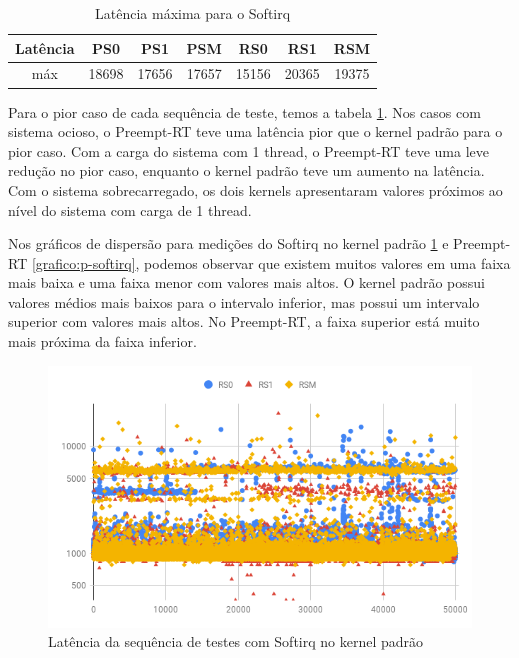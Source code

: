 \begin{table}[!htb]
    \centering
    \begin{center}
        \begin{tabular}{|c|c|c|c|c|c|c|}
            \toprule
                Latência & PS0 &    PS1 &    PSM &    RS0 &     RS1 &    RSM \\
            \midrule
                máx & 18698 &  17656 &  17657 & 15156 &  20365 &  19375 \\
            \bottomrule
        \end{tabular}
    \end{center}
    \caption{Latência máxima para o Softirq}
    \label{table:max-softirq}
\end{table}

Para o pior caso de cada sequência de teste, temos a tabela \ref{table:max-softirq}. Nos casos com sistema ocioso, o Preempt-RT teve uma latência pior que o kernel padrão para o pior caso. Com a carga do sistema com 1 thread, o Preempt-RT teve uma leve redução no pior caso, enquanto o kernel padrão teve um aumento na latência. Com o sistema sobrecarregado, os dois kernels apresentaram valores próximos ao nível do sistema com carga de 1 thread.

Nos gráficos de dispersão para medições do Softirq no kernel padrão \ref{grafico:r-softirq} e Preempt-RT \ref{grafico:p-softirq}, podemos observar que existem muitos valores em uma faixa mais baixa e uma faixa menor com valores mais altos. O kernel padrão possui valores médios mais baixos para o intervalo inferior, mas possui um intervalo superior com valores mais altos. No Preempt-RT, a faixa superior está muito mais próxima da faixa inferior.

\begin{figure}[!htb]
    \centering
    \includegraphics[width=\textwidth]{graficos/rs-scatter.png}
    \caption{Latência da sequência de testes com Softirq no kernel padrão}
    \label{grafico:r-softirq}
\end{figure}

